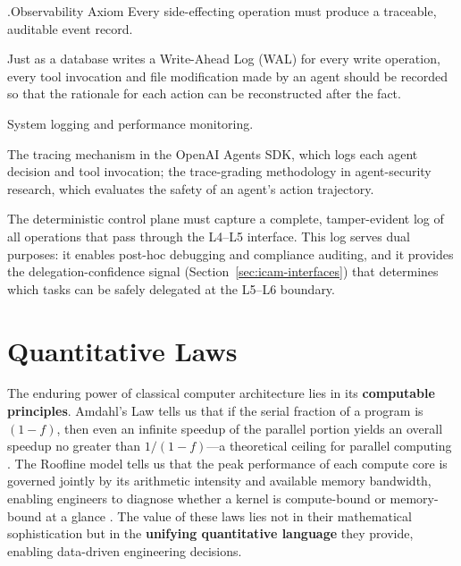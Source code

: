 \documentclass[11pt,a4paper]{article}
\newcounter{axiom}[section]
\renewcommand{\theaxiom}{\thesection.\arabic{axiom}}
\begin{document}
\begin{axiombox}{\theaxiom\enspace Observability Axiom}
Every side-effecting operation must produce a traceable, auditable event record.
\end{axiombox}
\begin{description}[style=nextline,leftmargin=2em,font=\bfseries]
\item[Intuition] Just as a database writes a Write-Ahead Log (WAL) for every write operation, every tool invocation and file modification made by an agent should be recorded so that the rationale for each action can be reconstructed after the fact.
\item[Classical source] System logging and performance monitoring\cite{linux_cgroup_2026}.
\item[ICAM embodiment] The tracing mechanism in the OpenAI Agents SDK\cite{openai_codex_agentsdk_2026}, which logs each agent decision and tool invocation; the trace-grading methodology in agent-security research\cite{agenticsecurity2025}, which evaluates the safety of an agent's action trajectory.
\item[Design implication] The deterministic control plane must capture a complete, tamper-evident log of all operations that pass through the L4--L5 interface. This log serves dual purposes: it enables post-hoc debugging and compliance auditing, and it provides the delegation-confidence signal (Section~\ref{sec:icam-interfaces}) that determines which tasks can be safely delegated at the L5--L6 boundary.
\end{description}




\section{Quantitative Laws}
\label{sec:laws}

The enduring power of classical computer architecture lies in its \textbf{computable principles}. Amdahl's Law tells us that if the serial fraction of a program is $(1-f)$, then even an infinite speedup of the parallel portion yields an overall speedup no greater than $1/(1-f)$---a theoretical ceiling for parallel computing \cite{hennessy2017quantitative}. The Roofline model tells us that the peak performance of each compute core is governed jointly by its arithmetic intensity and available memory bandwidth, enabling engineers to diagnose whether a kernel is compute-bound or memory-bound at a glance \cite{hennessy2017quantitative}. The value of these laws lies not in their mathematical sophistication but in the \textbf{unifying quantitative language} they provide, enabling data-driven engineering decisions.
\end{document}
